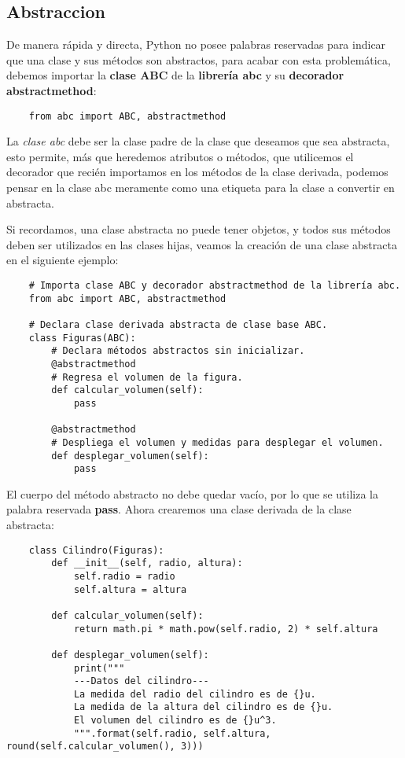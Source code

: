 \subsection{Abstraccion}

De manera rápida y directa, Python no posee palabras reservadas para indicar que una clase y sus métodos son abstractos, para acabar con esta problemática, debemos importar la \textbf{clase ABC} de la \textbf{librería abc} y su \textbf{decorador abstractmethod}:
\begin{lstlisting}
    from abc import ABC, abstractmethod
\end{lstlisting}

La \textit{clase abc} debe ser la clase padre de la clase que deseamos que sea abstracta, esto permite, más que heredemos atributos o métodos, que utilicemos el decorador que recién importamos en los métodos de la clase derivada, podemos pensar en la clase abc meramente como una etiqueta para la clase a convertir en abstracta.

Si recordamos, una clase abstracta no puede tener objetos, y todos sus métodos deben ser utilizados en las clases hijas, veamos la creación de una clase abstracta en el siguiente ejemplo:
\begin{lstlisting}
    # Importa clase ABC y decorador abstractmethod de la librería abc.
    from abc import ABC, abstractmethod

    # Declara clase derivada abstracta de clase base ABC.
    class Figuras(ABC):
        # Declara métodos abstractos sin inicializar.
        @abstractmethod
        # Regresa el volumen de la figura.
        def calcular_volumen(self):
            pass

        @abstractmethod
        # Despliega el volumen y medidas para desplegar el volumen.
        def desplegar_volumen(self):
            pass
\end{lstlisting}

El cuerpo del método abstracto no debe quedar vacío, por lo que se utiliza la palabra reservada \textbf{pass}. Ahora crearemos una clase derivada de la clase abstracta:
\begin{lstlisting}
    class Cilindro(Figuras):
        def __init__(self, radio, altura):
            self.radio = radio
            self.altura = altura

        def calcular_volumen(self):
            return math.pi * math.pow(self.radio, 2) * self.altura

        def desplegar_volumen(self):
            print("""
            ---Datos del cilindro---
            La medida del radio del cilindro es de {}u.
            La medida de la altura del cilindro es de {}u.
            El volumen del cilindro es de {}u^3.
            """.format(self.radio, self.altura, 										round(self.calcular_volumen(), 3)))
\end{lstlisting}

